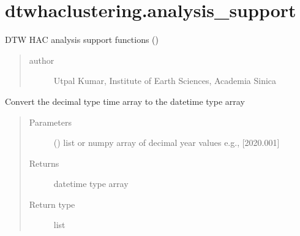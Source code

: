 \documentclass[letterpaper,10pt,english]{sphinxmanual}
\begin{document}
\chapter{dtwhaclustering.analysis\_support}
\label{\detokenize{modules/analysis_support:module-dtwhaclustering.analysis_support}}\label{\detokenize{modules/analysis_support:dtwhaclustering-analysis-support}}\label{\detokenize{modules/analysis_support::doc}}
\sphinxAtStartPar
DTW HAC analysis support functions ()
\begin{quote}\begin{description}
\item[{author}] \leavevmode
\sphinxAtStartPar
Utpal Kumar, Institute of Earth Sciences, Academia Sinica

\end{description}\end{quote}

\begin{fulllineitems}
\label{\detokenize{modules/analysis_support:dtwhaclustering.analysis_support.dec2dt}}
\sphinxAtStartPar
Convert the decimal type time array to the date\sphinxhyphen{}time type array
\begin{quote}\begin{description}
\item[{Parameters}] \leavevmode
\sphinxAtStartPar
{} () \textendash{} list or numpy array of decimal year values e.g., {[}2020.001{]}

\item[{Returns}] \leavevmode
\sphinxAtStartPar
date\sphinxhyphen{}time type array

\item[{Return type}] \leavevmode
\sphinxAtStartPar
list

\end{description}\end{quote}

\end{fulllineitems}
\end{document}
